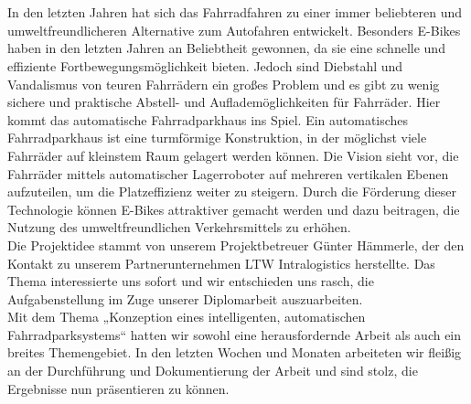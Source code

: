 \section*{}
In den letzten Jahren hat sich das Fahrradfahren zu einer immer beliebteren und umweltfreundlicheren Alternative zum Autofahren entwickelt. Besonders E-Bikes haben in den letzten Jahren an Beliebtheit gewonnen, da sie eine schnelle und effiziente Fortbewegungsmöglichkeit bieten. Jedoch sind Diebstahl und Vandalismus von teuren Fahrrädern ein großes Problem und es gibt zu wenig sichere und praktische Abstell- und Auflademöglichkeiten für Fahrräder. Hier kommt das automatische Fahrradparkhaus ins Spiel. Ein automatisches Fahrradparkhaus ist eine turmförmige Konstruktion, in der möglichst viele Fahrräder auf kleinstem Raum gelagert werden können. Die Vision sieht vor, die Fahrräder mittels automatischer Lagerroboter auf mehreren vertikalen Ebenen aufzuteilen, um die Platzeffizienz weiter zu steigern. Durch die Förderung dieser Technologie können E-Bikes attraktiver gemacht werden und dazu beitragen, die Nutzung des umweltfreundlichen Verkehrsmittels zu erhöhen.\\
Die Projektidee stammt von unserem Projektbetreuer Günter Hämmerle, der den Kontakt zu unserem Partnerunternehmen LTW Intralogistics herstellte. Das Thema interessierte uns sofort und wir entschieden uns rasch, die Aufgabenstellung im Zuge unserer Diplomarbeit auszuarbeiten.\\
Mit dem Thema „Konzeption eines intelligenten, automatischen Fahrradparksystems“ hatten wir sowohl eine herausfordernde Arbeit als auch ein breites Themengebiet. In den letzten Wochen und Monaten arbeiteten wir fleißig an der Durchführung und Dokumentierung der Arbeit und sind stolz, die Ergebnisse nun präsentieren zu können.\\